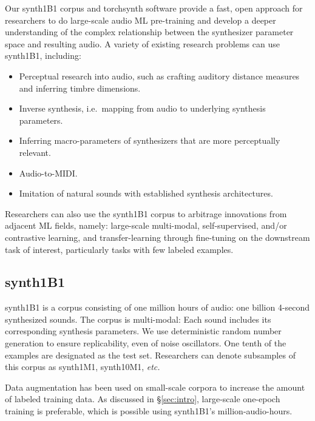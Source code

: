 Our synth1B1 corpus and torchsynth software provide a fast, open approach for researchers to do large-scale audio ML pre-training and develop a deeper understanding of the complex relationship between the synthesizer parameter space and resulting audio.
A variety of existing research problems can use synth1B1, including:
\begin{itemize}
\item Perceptual research into audio, such as crafting auditory distance measures and inferring timbre dimensions. \cite{vahidi2020timbre}
\item Inverse synthesis, i.e.\ mapping from audio to underlying synthesis parameters.
\cite{yee2018automatic,esling2020flow}
\item Inferring macro-parameters of synthesizers that are more perceptually relevant. \cite{esling2020flow, tatar2021latent}
\item Audio-to-MIDI. \cite{47659}
\item Imitation of natural sounds with established synthesis architectures.
\end{itemize}
Researchers can also use the synth1B1 corpus to arbitrage innovations from adjacent ML fields, namely: large-scale multi-modal, self-supervised, and/or contrastive learning, and transfer-learning through fine-tuning on the downstream task of interest, particularly tasks with few labeled examples.

\subsection{synth1B1}
\label{section:synth1B1}

synth1B1 is a corpus consisting of one million hours of audio: one billion 4-second synthesized sounds. The corpus is multi-modal: Each sound includes its corresponding synthesis parameters. We use deterministic random number generation to ensure replicability, even of noise oscillators. One tenth of the examples are designated as the test set. Researchers can denote subsamples of this corpus as synth1M1, synth10M1, {\em etc.} %

Data augmentation has been used on small-scale corpora to increase the amount of labeled training data. As discussed in \S\ref{sec:intro}, large-scale one-epoch training is preferable, which is possible using synth1B1's million-audio-hours.

